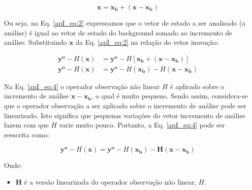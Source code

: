 \begin{equation}
  \label{apI_eq:2}
 \mathbf{x} = \mathbf{x_{b}} + (\mathbf{x} - \mathbf{x_{b}})
\end{equation}

Ou seja, na Eq. \ref{apI_eq:2} expressamos que o vetor de estado a ser analisado (a análise) é igual ao vetor de estado do background somado ao incremento de análise. Substituindo $\mathbf{x}$ da Eq. \ref{apI_eq:2} na relação do vetor inovação:



\begin{align}
  \label{apI_eq:3}
  \mathbf{y^{o}} - \textit{H}(\mathbf{x}) & = \mathbf{y^{o}} - \textit{H}[\mathbf{x_{b}} + (\mathbf{x} - \mathbf{x_{b}})] \\
  \label{apI_eq:4}
  \mathbf{y^{o}} - \textit{H}(\mathbf{x}) & = \mathbf{y^{o}} - \textit{H}(\mathbf{x_{b}}) - \textit{H}(\mathbf{x} - \mathbf{x_{b}})
\end{align}

Na Eq. \ref{apI_eq:4} o operador observação não linear $\textit{H}$ é aplicado sobre o incremento de análise $\mathbf{x} - \mathbf{x_{b}}$, o qual é muito pequeno. Sendo assim, considera-se que o operador observação a ser aplicado sobre o incremento de análise pode ser linearizado. Isto significa que pequenas variações do vetor incremento de análise fazem com que $\textit{H}$ varie muito pouco. Portanto, a Eq. \ref{apI_eq:4} pode ser reescrita como:

\begin{equation}
  \label{apI_eq:5}
  \mathbf{y^{o}} - \textit{H}(\mathbf{x}) = \mathbf{y^{o}} - \textit{H}(\mathbf{x_{b}}) - \mathbf{H}(\mathbf{x} - \mathbf{x_{b}})
\end{equation}

Onde:

\begin{itemize}
  \item $\mathbf{H}$ é a versão linearizada do operador observação não linear, $\textit{H}$.
\end{itemize}

